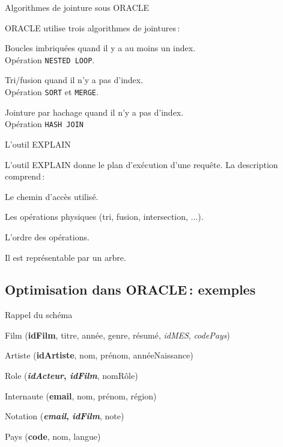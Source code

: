 \begin{frame}{Algorithmes de jointure sous ORACLE}


ORACLE utilise trois algorithmes de jointures\,:
\begin{redbullet}
  \item \alert{Boucles imbriquées} quand il y a au moins un index.\\
	Opération \texttt{NESTED\ LOOP}.
   \item  \alert{Tri/fusion} quand il n'y a pas d'index.\\
	Opération \texttt{SORT} et \texttt{MERGE}.

   \item  \alert{Jointure par hachage} quand il n'y a pas d'index.\\
	Opération  \texttt{HASH JOIN}

\end{redbullet}

\end{frame}


\begin{frame}{L'outil EXPLAIN}

L'outil EXPLAIN donne le plan d'exécution d'une requ\^ete. La
description comprend\,:
\begin{redbullet}
  \item Le chemin d'accès utilisé.
  \item Les opérations physiques (tri, fusion, intersection, ...).
  \item L'ordre des opérations. 
\end{redbullet}

Il est représentable par un arbre.

\end{frame}


\subsection{Optimisation dans ORACLE\,: exemples}

\begin{frame}{Rappel du schéma}
\begin{redbullet}
  \item Film (\textbf{idFilm}, titre, année, genre, résumé,
                                \textit{idMES}, \textit{codePays})
 \item Artiste (\textbf{idArtiste}, nom, prénom, annéeNaissance)
  \item Role (\textbf{\textit{idActeur}, \textit{idFilm}}, nomRôle)
   \item Internaute (\textbf{email}, nom, prénom, région)
  \item Notation (\textbf{\textit{email}, \textit{idFilm}}, note)
   \item Pays (\textbf{code}, nom, langue)
\end{redbullet}

\end{frame}

